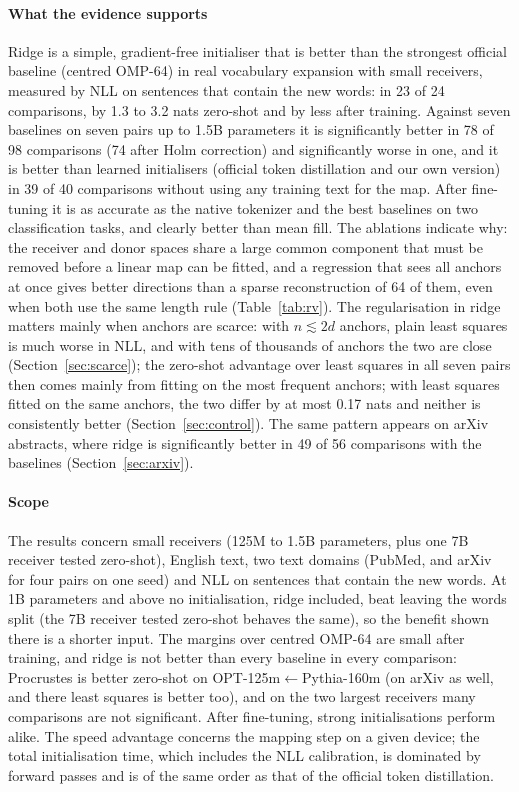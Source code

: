 \documentclass[preprint,12pt]{elsarticle}
\begin{document}
\paragraph{What the evidence supports} Ridge is a simple, gradient-free initialiser that is better than the strongest official baseline (centred OMP-64) in real vocabulary expansion with small receivers, measured by NLL on sentences that contain the new words: in 23 of 24 comparisons, by 1.3 to 3.2 nats zero-shot and by less after training. Against seven baselines on seven pairs up to 1.5B parameters it is significantly better in 78 of 98 comparisons (74 after Holm correction) and significantly worse in one, and it is better than learned initialisers (official token distillation and our own version) in 39 of 40 comparisons without using any training text for the map. After fine-tuning it is as accurate as the native tokenizer and the best baselines on two classification tasks, and clearly better than mean fill. The ablations indicate why: the receiver and donor spaces share a large common component that must be removed before a linear map can be fitted, and a regression that sees all anchors at once gives better directions than a sparse reconstruction of 64 of them, even when both use the same length rule (Table~\ref{tab:rv}). The regularisation in ridge matters mainly when anchors are scarce: with $n\lesssim 2d$ anchors, plain least squares is much worse in NLL, and with tens of thousands of anchors the two are close (Section~\ref{sec:scarce}); the zero-shot advantage over least squares in all seven pairs then comes mainly from fitting on the most frequent anchors; with least squares fitted on the same anchors, the two differ by at most 0.17 nats and neither is consistently better (Section~\ref{sec:control}). The same pattern appears on arXiv abstracts, where ridge is significantly better in 49 of 56 comparisons with the baselines (Section~\ref{sec:arxiv}).

\paragraph{Scope} The results concern small receivers (125M to 1.5B parameters, plus one 7B receiver tested zero-shot), English text, two text domains (PubMed, and arXiv for four pairs on one seed) and NLL on sentences that contain the new words. At 1B parameters and above no initialisation, ridge included, beat leaving the words split (the 7B receiver tested zero-shot behaves the same), so the benefit shown there is a shorter input. The margins over centred OMP-64 are small after training, and ridge is not better than every baseline in every comparison: Procrustes is better zero-shot on OPT-125m$\leftarrow$Pythia-160m (on arXiv as well, and there least squares is better too), and on the two largest receivers many comparisons are not significant. After fine-tuning, strong initialisations perform alike. The speed advantage concerns the mapping step on a given device; the total initialisation time, which includes the NLL calibration, is dominated by forward passes and is of the same order as that of the official token distillation.
\end{document}
